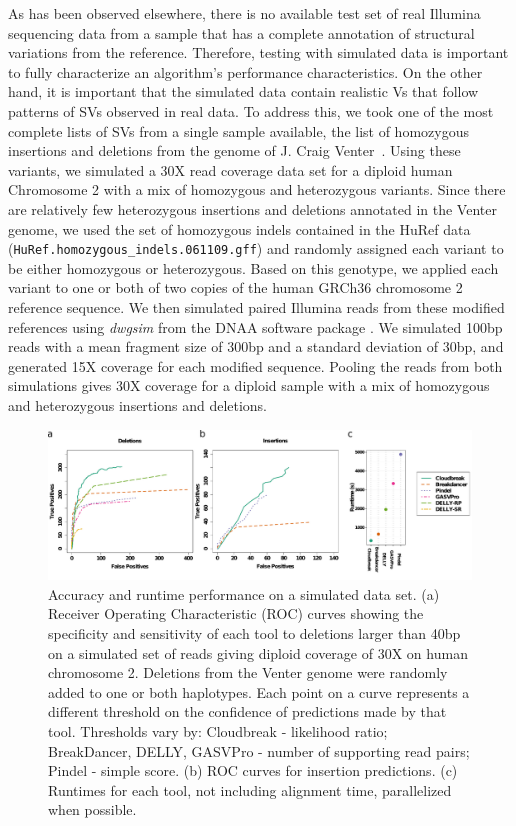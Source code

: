 As has been observed elsewhere, there is no available test set of real Illumina sequencing data from a sample that has a complete annotation of structural variations from the reference. Therefore, testing with simulated data is important to fully characterize an algorithm's performance characteristics. On the other hand, it is important that the simulated data contain realistic Vs that follow patterns of SVs observed in real data. To address this, we took one of the most complete lists of SVs from a single sample available, the list of homozygous insertions and deletions from the genome of J. Craig Venter~\cite{Levy:2007fb}. Using these variants, we simulated a 30X read coverage data set for a diploid human Chromosome 2 with a mix of homozygous and heterozygous variants.  Since there are relatively few heterozygous insertions and deletions annotated in the Venter genome, we used the set of homozygous indels contained in the HuRef data (\texttt{HuRef.homozygous\_indels.061109.gff}) and randomly assigned each variant to be either homozygous or heterozygous. Based on this genotype, we applied each variant to one or both of two copies of the human GRCh36 chromosome 2 reference sequence. We then simulated paired Illumina reads from these modified references using \emph{dwgsim} from the DNAA software package \cite{DNAA}. We simulated 100bp reads with a mean fragment size of 300bp and a standard deviation of 30bp, and generated 15X coverage for each modified sequence. Pooling the reads from both simulations gives 30X coverage for a diploid sample with a mix of homozygous and heterozygous insertions and deletions.


\begin{figure}
\centering
\includegraphics[width=1\textwidth]{figures/chr2_sim_rocs_runtime.pdf}
\caption{Accuracy and runtime performance on a simulated data set. (a) Receiver Operating Characteristic (ROC) curves showing the specificity and sensitivity of each tool to deletions larger than 40bp on a simulated set of reads giving diploid coverage of 30X on human chromosome 2. Deletions from the Venter genome were randomly added to one or both haplotypes. Each point on a curve represents a different threshold on the confidence of predictions made by that tool. Thresholds vary by: Cloudbreak - likelihood ratio; BreakDancer, DELLY, GASVPro - number of supporting read pairs; Pindel - simple score. (b) ROC curves for insertion predictions. (c) Runtimes for each tool, not including alignment time, parallelized when possible.}
\label{chr2CombinedRoc}
\end{figure}

